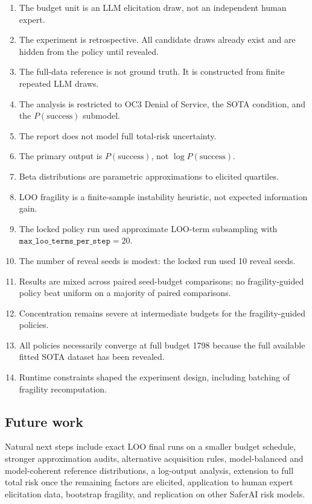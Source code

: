 \documentclass[11pt]{article}
\newcommand{\psuccess}{P(\mathrm{success})}
\begin{document}
\begin{enumerate}
    \item The budget unit is an LLM elicitation draw, not an independent human expert.
    \item The experiment is retrospective. All candidate draws already exist and are hidden from the policy until revealed.
    \item The full-data reference is not ground truth. It is constructed from finite repeated LLM draws.
    \item The analysis is restricted to OC3 Denial of Service, the SOTA condition, and the \(\psuccess\) submodel.
    \item The report does not model full total-risk uncertainty.
    \item The primary output is \(\psuccess\), not \(\log \psuccess\).
    \item Beta distributions are parametric approximations to elicited quartiles.
    \item LOO fragility is a finite-sample instability heuristic, not expected information gain.
    \item The locked policy run used approximate LOO-term subsampling with \(\texttt{max\_loo\_terms\_per\_step}=20\).
    \item The number of reveal seeds is modest: the locked run used 10 reveal seeds.
    \item Results are mixed across paired seed-budget comparisons; no fragility-guided policy beat uniform on a majority of paired comparisons.
    \item Concentration remains severe at intermediate budgets for the fragility-guided policies.
    \item All policies necessarily converge at full budget 1798 because the full available fitted SOTA dataset has been revealed.
    \item Runtime constraints shaped the experiment design, including batching of fragility recomputation.
\end{enumerate}

\subsection{Future work}

Natural next steps include exact LOO final runs on a smaller budget schedule, stronger approximation audits, alternative acquisition rules, model-balanced and model-coherent reference distributions, a log-output analysis, extension to full total risk once the remaining factors are elicited, application to human expert elicitation data, bootstrap fragility, and replication on other SaferAI risk models.
\end{document}
